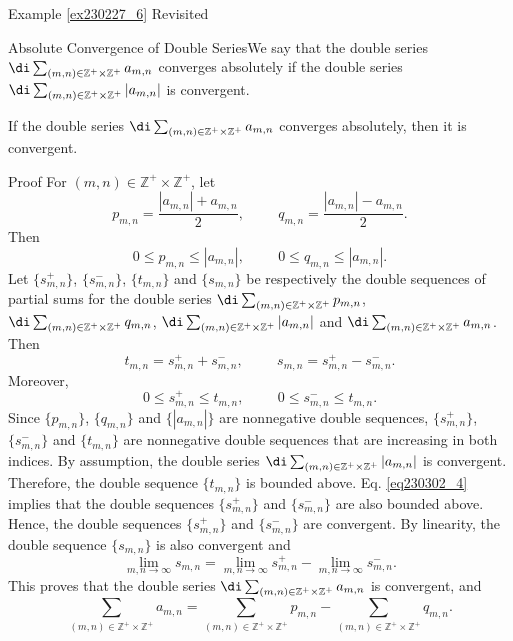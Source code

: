 \begin{example}{\linkt Example \ref{ex230227_6} Revisited}
\begin{example}[label=ex230227_13]{}
\begin{example}{}
\begin{definition}{Absolute Convergence of Double Series}We say that the double series $\di \sum_{(m,n)\in\mathbb{Z}^+\times\mathbb{Z}^+}a_{m,n}$
converges absolutely if the double series  $\di \sum_{(m,n)\in\mathbb{Z}^+\times\mathbb{Z}^+}|a_{m,n}|$ is convergent.
\end{definition}
\begin{theorem}[label=230302_12]{}
If the double series $\di \sum_{(m,n)\in\mathbb{Z}^+\times\mathbb{Z}^+}a_{m,n}$ converges absolutely, then it is convergent.
\end{theorem}
\begin{myproof}{Proof}
 For $(m,n)\in\mathbb{Z}^+\times\mathbb{Z}^+$, let
\[p_{m,n}=\frac{|a_{m,n}|+a_{m,n}}{2},\hspace{1cm}q_{m,n}=\frac{|a_{m,n}|-a_{m,n}}{2}.\]Then \[0\leq p_{m,n}\leq |a_{m,n}|,\hspace{1cm}0\leq q_{m,n}\leq |a_{m,n}|.\]Let 
$\{s^+_{m,n}\}$, $\{s^-_{m,n}\}$, $\{t_{m,n}\}$ and $\{s_{m,n}\}$ be respectively the double sequences of partial sums for the double series $\di\sum_{(m,n)\in\mathbb{Z}^+\times\mathbb{Z}^+}p_{m,n}$, $\di\sum_{(m,n)\in\mathbb{Z}^+\times\mathbb{Z}^+}q_{m,n}$, $\di\sum_{(m,n)\in\mathbb{Z}^+\times\mathbb{Z}^+}|a_{m,n}|$ and $\di\sum_{(m,n)\in\mathbb{Z}^+\times\mathbb{Z}^+}a_{m,n}$. Then
\[t_{m,n}=s^+_{m,n}+s^-_{m,n},\hspace{1cm} s_{m,n}=s^+_{m,n}-s^-_{m,n}.\]Moreover,
\begin{equation}\label{eq230302_4}0\leq s^+_{m,n}\leq t_{m,n},\hspace{1cm}0\leq s^-_{m,n}\leq t_{m,n}.\end{equation}
Since $\{p_{m,n}\}$, $\{q_{m,n}\}$ and $\{|a_{m,n}|\}$ are nonnegative double sequences, $\{s^+_{m,n}\}$, $\{s^-_{m,n}\}$ and $\{t_{m,n}\}$ are nonnegative double sequences that are increasing in both indices. By assumption, the double series $\di \sum_{(m,n)\in\mathbb{Z}^+\times\mathbb{Z}^+}|a_{m,n}|$ is convergent. Therefore, the double sequence $\{t_{m,n}\}$ is bounded above. Eq. \eqref{eq230302_4} implies that the double sequences  $\{s^+_{m,n}\}$ and  $\{s^-_{m,n}\}$ are also bounded above. Hence, the   double sequences  $\{s^+_{m,n}\}$ and  $\{s^-_{m,n}\}$ are convergent. By linearity, the double sequence $\{s_{m,n}\}$ is also convergent and
\[\lim_{m,n\to\infty}s_{m,n}=\lim_{m,n\to\infty}s^+_{m,n}-\lim_{m,n\to\infty}s^-_{m,n}.\] This proves that the double series $\di \sum_{(m,n)\in\mathbb{Z}^+\times\mathbb{Z}^+}a_{m,n}$ is convergent, and
\[\sum_{(m,n)\in\mathbb{Z}^+\times\mathbb{Z}^+}a_{m,n}=\sum_{(m,n)\in\mathbb{Z}^+\times\mathbb{Z}^+}p_{m,n}-\sum_{(m,n)\in\mathbb{Z}^+\times\mathbb{Z}^+}q_{m,n}.\]

\end{myproof}
\end{example}
\end{example}
\end{example}
